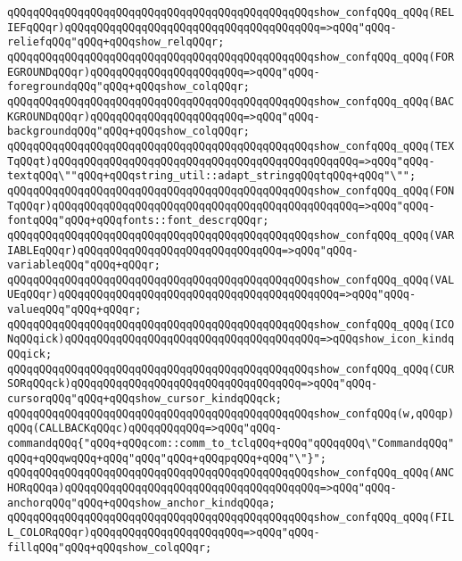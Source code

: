 \verb|qQQqqQQqqQQqqQQqqQQqqQQqqQQqqQQqqQQqqQQqqQQqqQQqshow_confqQQq_qQQq(RELIEFqQQqr)qQQqqQQqqQQqqQQqqQQqqQQqqQQqqQQqqQQqqQQq=>qQQq"qQQq-reliefqQQq"qQQq+qQQqshow_relqQQqr;|\newline
\verb|qQQqqQQqqQQqqQQqqQQqqQQqqQQqqQQqqQQqqQQqqQQqqQQqshow_confqQQq_qQQq(FOREGROUNDqQQqr)qQQqqQQqqQQqqQQqqQQqqQQq=>qQQq"qQQq-foregroundqQQq"qQQq+qQQqshow_colqQQqr;|\newline
\verb|qQQqqQQqqQQqqQQqqQQqqQQqqQQqqQQqqQQqqQQqqQQqqQQqshow_confqQQq_qQQq(BACKGROUNDqQQqr)qQQqqQQqqQQqqQQqqQQqqQQq=>qQQq"qQQq-backgroundqQQq"qQQq+qQQqshow_colqQQqr;|\newline
\verb|qQQqqQQqqQQqqQQqqQQqqQQqqQQqqQQqqQQqqQQqqQQqqQQqshow_confqQQq_qQQq(TEXTqQQqt)qQQqqQQqqQQqqQQqqQQqqQQqqQQqqQQqqQQqqQQqqQQqqQQq=>qQQq"qQQq-textqQQq\""qQQq+qQQqstring_util::adapt_stringqQQqtqQQq+qQQq"\"";|\newline
\verb|qQQqqQQqqQQqqQQqqQQqqQQqqQQqqQQqqQQqqQQqqQQqqQQqshow_confqQQq_qQQq(FONTqQQqr)qQQqqQQqqQQqqQQqqQQqqQQqqQQqqQQqqQQqqQQqqQQqqQQq=>qQQq"qQQq-fontqQQq"qQQq+qQQqfonts::font_descrqQQqr;|\newline
\verb|qQQqqQQqqQQqqQQqqQQqqQQqqQQqqQQqqQQqqQQqqQQqqQQqshow_confqQQq_qQQq(VARIABLEqQQqr)qQQqqQQqqQQqqQQqqQQqqQQqqQQqqQQq=>qQQq"qQQq-variableqQQq"qQQq+qQQqr;|\newline
\verb|qQQqqQQqqQQqqQQqqQQqqQQqqQQqqQQqqQQqqQQqqQQqqQQqshow_confqQQq_qQQq(VALUEqQQqr)qQQqqQQqqQQqqQQqqQQqqQQqqQQqqQQqqQQqqQQqqQQq=>qQQq"qQQq-valueqQQq"qQQq+qQQqr;|\newline
\verb|qQQqqQQqqQQqqQQqqQQqqQQqqQQqqQQqqQQqqQQqqQQqqQQqshow_confqQQq_qQQq(ICONqQQqick)qQQqqQQqqQQqqQQqqQQqqQQqqQQqqQQqqQQqqQQq=>qQQqshow_icon_kindqQQqick;|\newline
\verb|qQQqqQQqqQQqqQQqqQQqqQQqqQQqqQQqqQQqqQQqqQQqqQQqshow_confqQQq_qQQq(CURSORqQQqck)qQQqqQQqqQQqqQQqqQQqqQQqqQQqqQQqqQQq=>qQQq"qQQq-cursorqQQq"qQQq+qQQqshow_cursor_kindqQQqck;|\newline
\verb|qQQqqQQqqQQqqQQqqQQqqQQqqQQqqQQqqQQqqQQqqQQqqQQqshow_confqQQq(w,qQQqp)qQQq(CALLBACKqQQqc)qQQqqQQqqQQq=>qQQq"qQQq-commandqQQq{"qQQq+qQQqcom::comm_to_tclqQQq+qQQq"qQQqqQQq\"CommandqQQq"qQQq+qQQqwqQQq+qQQq"qQQq"qQQq+qQQqpqQQq+qQQq"\"}";|\newline
\verb|qQQqqQQqqQQqqQQqqQQqqQQqqQQqqQQqqQQqqQQqqQQqqQQqshow_confqQQq_qQQq(ANCHORqQQqa)qQQqqQQqqQQqqQQqqQQqqQQqqQQqqQQqqQQqqQQq=>qQQq"qQQq-anchorqQQq"qQQq+qQQqshow_anchor_kindqQQqa;|\newline
\verb|qQQqqQQqqQQqqQQqqQQqqQQqqQQqqQQqqQQqqQQqqQQqqQQqshow_confqQQq_qQQq(FILL_COLORqQQqr)qQQqqQQqqQQqqQQqqQQqqQQq=>qQQq"qQQq-fillqQQq"qQQq+qQQqshow_colqQQqr;|\newline
